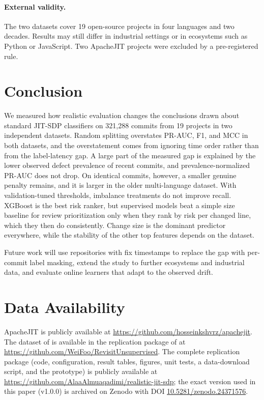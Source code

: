 \paragraph{External validity.} The two datasets cover 19 open-source projects in four languages and two decades. Results may still differ in industrial settings or in ecosystems such as Python or JavaScript. Two ApacheJIT projects were excluded by a pre-registered rule.

\section{Conclusion}\label{sec:conclusion}

We measured how realistic evaluation changes the conclusions drawn about standard JIT-SDP classifiers on 321{,}288 commits from 19 projects in two independent datasets. Random splitting overstates PR-AUC, F1, and MCC in both datasets, and the overstatement comes from ignoring time order rather than from the label-latency gap. A large part of the measured gap is explained by the lower observed defect prevalence of recent commits, and prevalence-normalized PR-AUC does not drop. On identical commits, however, a smaller genuine penalty remains, and it is larger in the older multi-language dataset. With validation-tuned thresholds, imbalance treatments do not improve recall. XGBoost is the best risk ranker, but supervised models beat a simple size baseline for review prioritization only when they rank by risk per changed line, which they then do consistently. Change size is the dominant predictor everywhere, while the stability of the other top features depends on the dataset.

Future work will use repositories with fix timestamps to replace the gap with per-commit label masking, extend the study to further ecosystems and industrial data, and evaluate online learners that adapt to the observed drift.

\section*{Data Availability}

\noindent ApacheJIT is publicly available at \url{https://github.com/hosseinkshvrz/apachejit}. The dataset of \citet{kamei2013} is available in the replication package of \citet{fu2017} at \url{https://github.com/WeiFoo/RevisitUnsupervised}. The complete replication package (code, configuration, result tables, figures, unit tests, a data-download script, and the prototype) is publicly available at \url{https://github.com/AlaaAlmuaqadimi/realistic-jit-sdp}; the exact version used in this paper (v1.0.0) is archived on Zenodo with DOI \href{https://doi.org/10.5281/zenodo.24371576}{10.5281/zenodo.24371576}.

